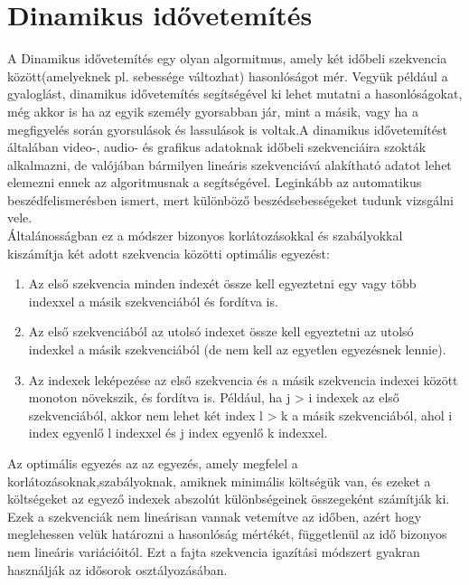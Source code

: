 \documentclass[a4paper,12pt]{paper}
\begin{document}
\section{Dinamikus idővetemítés}


A Dinamikus idővetemítés egy olyan algormitmus, amely két időbeli szekvencia között(amelyeknek pl. sebessége változhat) hasonlóságot mér. Vegyük például a gyaloglást, dinamikus idővetemítés segítségével ki lehet mutatni a hasonlóságokat, még akkor is ha az egyik személy gyorsabban jár, mint a másik, vagy ha a megfigyelés során gyorsulások és lassulások is voltak.A dinamikus idővetemítést általában video-, audio- és grafikus adatoknak időbeli szekvenciáira szokták alkalmazni, de valójában bármilyen lineáris szekvenciává alakítható adatot lehet elemezni ennek az algoritmusnak a segítségével. Leginkább az automatikus beszédfelismerésben ismert, mert különböző beszédsebességeket tudunk vizsgálni vele. 
\\Általánosságban ez a módszer bizonyos korlátozásokkal és szabályokkal kiszámítja két adott szekvencia közötti optimális egyezést:
\begin{enumerate}
	\item Az első szekvencia minden indexét össze kell egyeztetni egy vagy több indexxel a másik szekvenciából és fordítva is.
	\item Az első szekvenciából az utolsó indexet össze kell egyeztetni az utolsó indexkel a másik szekvenciából (de nem kell az egyetlen egyezésnek lennie).
	\item Az indexek leképezése az első szekvencia és a másik szekvencia indexei között monoton növekszik, és fordítva is. Például, ha j > i indexek az első szekvenciából, akkor nem lehet két index l > k a másik szekvenciából, ahol i index  egyenlő l indexxel és j index egyenlő k indexxel.
	 
\end{enumerate}
Az optimális egyezés az az egyezés, amely megfelel a korlátozásoknak,szabályoknak, amiknek minimális költségük van, és ezeket a költségeket az egyező indexek abszolút különbségeinek összegeként számítják ki.
\\Ezek a szekvenciák nem lineárisan vannak vetemítve az időben, azért hogy meglehessen velük határozni a hasonlóság mértékét, függetlenül az idő bizonyos nem lineáris variációitól. Ezt a fajta szekvencia igazítási módszert gyakran használják az idősorok osztályozásában. 
\end{document}
